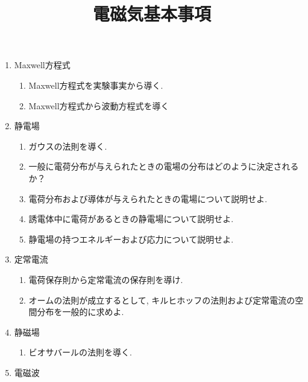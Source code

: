 \documentclass[11pt,a4paper]{jarticle}
\title{電磁気基本事項}
\author{}
\date{}
\begin{document}
\maketitle
\begin{enumerate}
    \item Maxwell方程式
    \begin{enumerate}
        \item Maxwell方程式を実験事実から導く.
        \item Maxwell方程式から波動方程式を導く
    \end{enumerate}
    \item 静電場
    \begin{enumerate}
        \item ガウスの法則を導く.
        \item 一般に電荷分布が与えられたときの電場の分布はどのように決定されるか？
        \item 電荷分布および導体が与えられたときの電場について説明せよ.
        \item 誘電体中に電荷があるときの静電場について説明せよ.
        \item 静電場の持つエネルギーおよび応力について説明せよ.
    \end{enumerate}
    \item 定常電流
    \begin{enumerate}
        \item 電荷保存則から定常電流の保存則を導け.
        \item オームの法則が成立するとして, キルヒホッフの法則および定常電流の空間分布を一般的に求めよ.
    \end{enumerate}
    \item 静磁場
    \begin{enumerate}
        \item ビオサバールの法則を導く.
    \end{enumerate}
    \item 電磁波
\end{enumerate}
\end{document}
